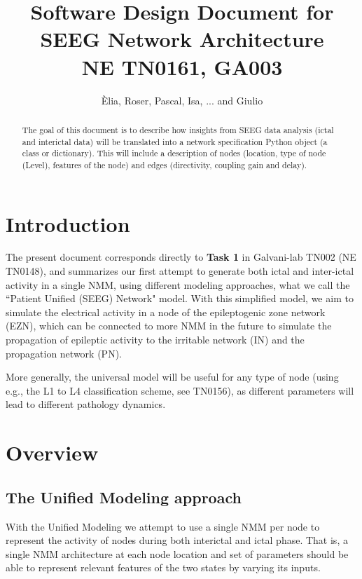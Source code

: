 \documentclass[11pt,oneside]{amsart}
\title[NE TN0161/GA003]{Software Design Document for SEEG Network Architecture \\  NE TN0161, GA003}
\author{Èlia, Roser, Pascal, Isa, ... and Giulio}
\begin{document}
\maketitle

\begin{abstract}
\normalsize
 The goal of this document is to describe how insights from SEEG data analysis (ictal and interictal data) will be translated into a network specification Python object (a class or dictionary). This will include a description of nodes (location, type of node (Level), features of the node) and edges (directivity, coupling gain and delay).

\end{abstract}

\tableofcontents

\clearpage
\section{Introduction}


The present document corresponds directly to \textbf{Task 1} in Galvani-lab TN002 (NE  TN0148), and summarizes our first attempt to generate both ictal and inter-ictal activity in a single NMM, using different modeling approaches, what we call the ``Patient Unified (SEEG) Network" model. With this simplified model, we aim to simulate the electrical activity in a node of the epileptogenic zone network (EZN), which can be connected to more NMM in the future to simulate the propagation of epileptic activity to the irritable network (IN) and the propagation network (PN). 

More generally, the universal model will be useful for any type of node (using e.g., the L1 to L4 classification scheme, see TN0156), as different parameters will lead to different pathology dynamics.


 \section{Overview}
 
 
 \subsection{The Unified Modeling approach}
 With the Unified Modeling we attempt to use a single NMM per node to represent the activity of nodes during both interictal and ictal phase. That is, a single NMM architecture at each node location and set of parameters should be able to represent relevant features of the two states by varying its inputs. 
 
\end{document}
